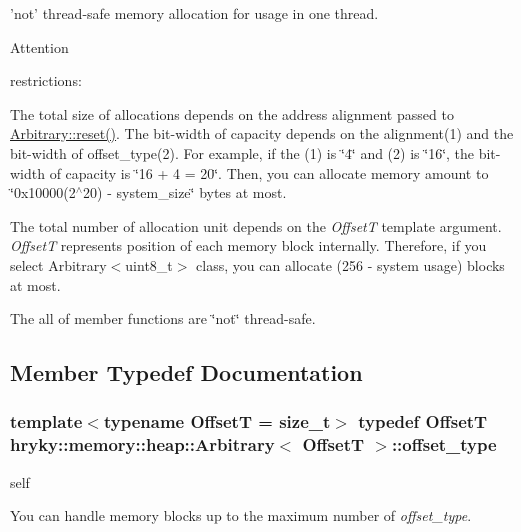 'not' thread-\/safe memory allocation for usage in one thread. 

\begin{DoxyAttention}{Attention}

\end{DoxyAttention}
restrictions\-:

The total size of allocations depends on the address alignment passed to \hyperlink{classhryky_1_1memory_1_1heap_1_1_arbitrary_ab67808c9f978e20899f0ec136344fda0}{Arbitrary\-::reset()}. The bit-\/width of capacity depends on the alignment(1) and the bit-\/width of offset\-\_\-type(2). For example, if the (1) is \char`\"{}4\char`\"{} and (2) is \char`\"{}16\char`\"{}, the bit-\/width of capacity is \char`\"{}16 + 4 = 20\char`\"{}. Then, you can allocate memory amount to \char`\"{}0x10000(2$^\wedge$20) -\/ system\-\_\-size\char`\"{} bytes at most.

The total number of allocation unit depends on the {\itshape Offset\-T\/} template argument. {\itshape Offset\-T\/} represents position of each memory block internally. Therefore, if you select Arbitrary$<$uint8\-\_\-t$>$ class, you can allocate (256 -\/ system usage) blocks at most.

The all of member functions are \char`\"{}not\char`\"{} thread-\/safe. 

\subsection{Member Typedef Documentation}
\hypertarget{classhryky_1_1memory_1_1heap_1_1_arbitrary_a93027662f345b66e738ce8b2c9293e94}{
\subsubsection[{offset\-\_\-type}]{\setlength{\rightskip}{0pt plus 5cm}template$<$typename Offset\-T = size\-\_\-t$>$ typedef Offset\-T {\bf hryky\-::memory\-::heap\-::\-Arbitrary}$<$ Offset\-T $>$\-::{\bf offset\-\_\-type}}}\label{classhryky_1_1memory_1_1heap_1_1_arbitrary_a93027662f345b66e738ce8b2c9293e94}


self 

You can handle memory blocks up to the maximum number of {\itshape offset\-\_\-type\/}. 

